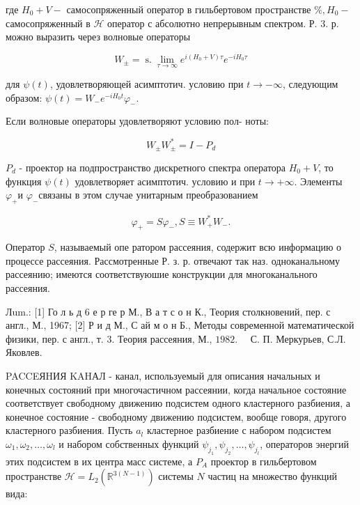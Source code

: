 \documentclass[10pt]{article}
\begin{document}
где $H_{0}+V-$ самосопряженный оператор в гильбертовом пространстве $\mathscr{\%}, H_{0}-$ самосопряженный в $\mathscr{H}$ оператор с абсолютно непрерывным спектром. Р. 3. р. можно выразить через волновые операторы



\[

W_{ \pm}=\operatorname{s.} \lim _{\tau \rightarrow \infty} e^{i\left(H_{0}+V\right) \tau} e^{-i H_{0} \tau}

\]



для $\psi(t)$, удовлетворяющей асимптотич. условию при $t \rightarrow-\infty$, следующим образом: $\psi(t)=W_{-} e^{-i H_{0} t} \varphi_{-}$.



Если волновые операторы удовлетворяют условию пол- ноты:



\[

W_{ \pm} W_{ \pm}^{*}=I-P_{d}

\]



$P_{d}$ - проектор на подпространство дискретного спектра оператора $H_{0}+V$, то функция $\psi(t)$ удовлетворяет асимптотич. условию и при $t \rightarrow+\infty$. Элементы $\varphi_{+}$и $\varphi_{-}$связаны в этом случае унитарным преобразованием



\[

\varphi_{+}=S \varphi_{-}, S \equiv W_{+}^{*} W_{-} .

\]



Оператор $S$, называемый опе ратором рассеяния, содержит всю информацию о процессе рассеяния. Рассмотренные Р. з. р. отвечают так наз. одноканальному рассеянию; имеются соответствуюшие конструкции для многоканального рассеяния.



Лum.: [1] Го л ь д 6 е р ге р М., В а т с о н К., Теория столкновений, пер. с англ., М., 1967; [2] Р и д М., С ай м о н Б., Методы современной математической физики, пер. с англ., т. 3. Теория рассеяния, М., $1982 . \quad$ С. П. Меркурьев, С.Л. Яковлев.



PACCEЯHИЯ KAHАЛ - канал, используемый для описания начальных и конечных состояний при многочастичном рассеянии, когда начальное состояние соответствует свободному движению подсистем одного кластерного разбиения, а конечное состояние - свободному движению подсистем, вообще говоря, другого кластерного разбиения. Пусть $a_{l}$ кластерное разбиение с набором подсистем $\omega_{1}, \omega_{2}, \ldots, \omega_{l}$ и набором собственных функций $\psi_{j_{1}}, \psi_{j_{2}}, \ldots, \psi_{j_{l}}$, операторов энергий этих подсистем в их центра масс системе, а $P_{A}$ проектор в гильбертовом пространстве $\mathscr{H}=L_{2}\left(\mathbb{R}^{3(N-1)}\right)$ системы $N$ частиц на множество функций вида:
\end{document}

